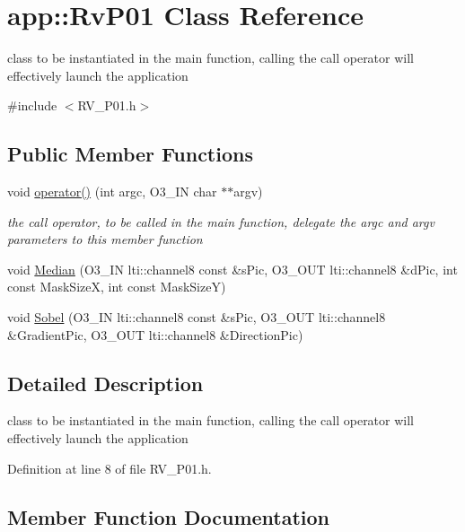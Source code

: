 \hypertarget{classapp_1_1_rv_p01}{}\section{app\+:\+:Rv\+P01 Class Reference}
\label{classapp_1_1_rv_p01}


class to be instantiated in the main function, calling the call operator will effectively launch the application  




{\ttfamily \#include $<$R\+V\+\_\+\+P01.\+h$>$}

\subsection*{Public Member Functions}
\begin{DoxyCompactItemize}
\item 
void \hyperlink{classapp_1_1_rv_p01_ab74e916d94b19b28b8ed0026bb43447e}{operator()} (int argc, O3\+\_\+\+I\+N char $\ast$$\ast$argv)
\begin{DoxyCompactList}\small\item\em the call operator, to be called in the main function, delegate the argc and argv parameters to this member function \end{DoxyCompactList}\item 
void \hyperlink{classapp_1_1_rv_p01_ab76c5414248933e77a07dc19091779d0}{Median} (O3\+\_\+\+I\+N lti\+::channel8 const \&s\+Pic, O3\+\_\+\+O\+U\+T lti\+::channel8 \&d\+Pic, int const Mask\+Size\+X, int const Mask\+Size\+Y)
\item 
void \hyperlink{classapp_1_1_rv_p01_a017983f1152c3d3338dc50d9819fce10}{Sobel} (O3\+\_\+\+I\+N lti\+::channel8 const \&s\+Pic, O3\+\_\+\+O\+U\+T lti\+::channel8 \&Gradient\+Pic, O3\+\_\+\+O\+U\+T lti\+::channel8 \&Direction\+Pic)
\end{DoxyCompactItemize}


\subsection{Detailed Description}
class to be instantiated in the main function, calling the call operator will effectively launch the application 

Definition at line 8 of file R\+V\+\_\+\+P01.\+h.



\subsection{Member Function Documentation}
\hypertarget{classapp_1_1_rv_p01_ab76c5414248933e77a07dc19091779d0}{}
